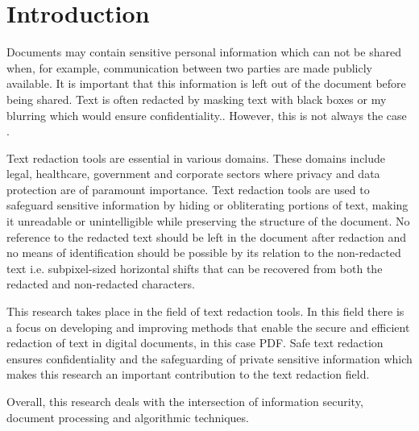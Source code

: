 \section{Introduction}
\label{sec:introduction}

Documents may contain sensitive personal information which can not be shared when, for example, communication between two parties are made publicly available. It is important that this information is left out of the document before being shared. Text is often redacted by masking text with black boxes or my blurring which would ensure confidentiality.. However, this is not always the case \cite{failures2019}. 

Text redaction tools are essential in various domains. These domains include legal, healthcare, government and corporate sectors where privacy and data protection are of paramount importance. Text redaction tools are used to safeguard sensitive information by hiding or obliterating portions of text, making it unreadable or unintelligible while preserving the structure of the document. No reference to the redacted text should be left in the document after redaction and no means of identification should be possible by its relation to the non-redacted text i.e. subpixel-sized horizontal shifts that can be recovered from both the redacted and non-redacted characters. 

This research takes place in the field of text redaction tools. In this field there is a focus on developing and improving methods that enable the secure and efficient redaction of text in digital documents, in this case PDF. Safe text redaction ensures confidentiality and the safeguarding of private sensitive information which makes this research an important contribution to the text redaction field. 

Overall, this research deals with the intersection of information security, document processing and algorithmic techniques.